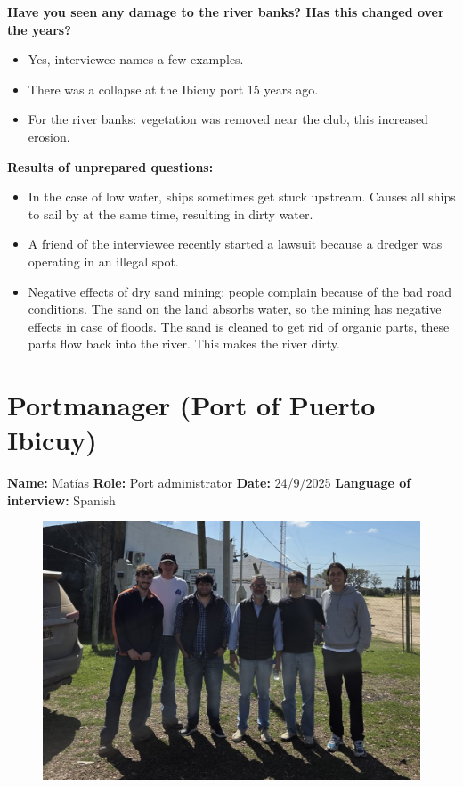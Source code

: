 \textbf{Have you seen any damage to the river banks? Has this changed over the years?}
\begin{itemize}
    \item Yes, interviewee names a few examples.
    \item There was a collapse at the Ibicuy port 15 years ago.
    \item For the river banks: vegetation was removed near the club, this increased erosion.
\end{itemize}

\textbf{Results of unprepared questions:}
\begin{itemize}
    \item In the case of low water, ships sometimes get stuck upstream. Causes all ships to sail by at the same time, resulting in dirty water.
    \item A friend of the interviewee recently started a lawsuit because a dredger was operating in an illegal spot.
    \item Negative effects of dry sand mining: people complain because of the bad road conditions. The sand on the land absorbs water, so the mining has negative effects in case of floods. The sand is cleaned to get rid of organic parts, these parts flow back into the river. This makes the river dirty.
\end{itemize}

\newpage
\section{Portmanager (Port of Puerto Ibicuy)}
\textbf{Name:} Matías \newline
\textbf{Role:} Port administrator \newline
\textbf{Date:} 24/9/2025 \newline
\textbf{Language of interview:} Spanish

\begin{figure}[H]
    \centering
    \includegraphics[width=0.5\linewidth]{figures/appendixE/InterviewPort.jpeg}
\end{figure}

